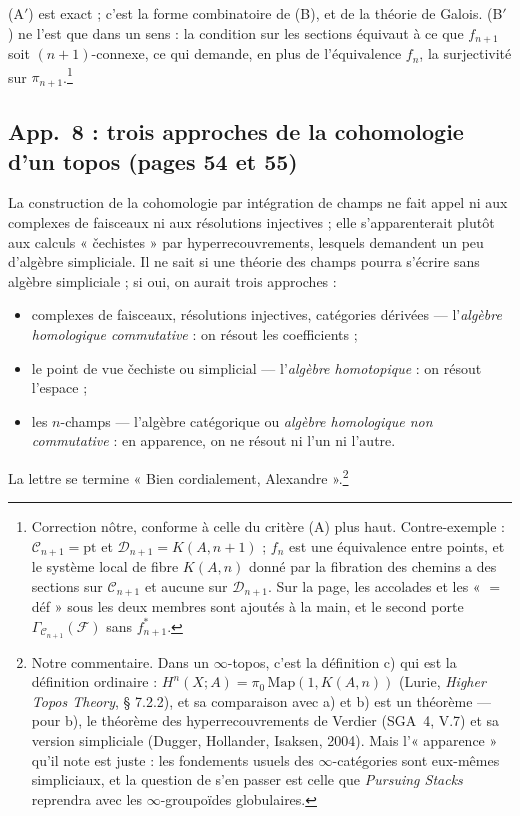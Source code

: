 \documentclass[11pt,a4paper]{article}
\begin{document}
(A$'$) est exact ; c'est la forme combinatoire de (B), et de la
théorie de Galois. (B$'$) ne l'est que dans un sens : la condition sur les
sections équivaut à ce que $f_{n+1}$ soit $(n+1)$-connexe, ce qui demande, en
plus de l'équivalence $f_n$, la surjectivité sur
$\pi_{n+1}$.\footnote{Correction nôtre, conforme à celle du critère (A) plus
haut. Contre-exemple : $\mathcal{C}_{n+1} = \mathrm{pt}$ et
$\mathcal{D}_{n+1} = K(A,n+1)$ ; $f_n$ est une équivalence entre points, et le
système local de fibre $K(A,n)$ donné par la fibration des chemins a des
sections sur $\mathcal{C}_{n+1}$ et aucune sur $\mathcal{D}_{n+1}$. Sur la
page, les accolades et les « $=$ déf » sous les deux membres sont ajoutés à
la main, et le second porte $\Gamma_{\mathcal{C}_{n+1}}(\mathcal{F})$ sans
$f_{n+1}^*$.}

\subsection*{App.~8 : trois approches de la cohomologie d'un topos (pages 54 et 55)}

La construction de la cohomologie par intégration de champs ne fait appel
ni aux complexes de faisceaux ni aux résolutions injectives ; elle
s'apparenterait plutôt aux calculs « čechistes » par hyperrecouvrements,
lesquels demandent un peu d'algèbre simpliciale. Il ne sait si une théorie
des champs pourra s'écrire sans algèbre simpliciale ; si oui, on aurait
trois approches :

\begin{itemize}
  \item[a)] complexes de faisceaux, résolutions injectives, catégories
  dérivées --- l'\emph{algèbre homologique commutative} : on résout les
  coefficients ;
  \item[b)] le point de vue čechiste ou simplicial --- l'\emph{algèbre
  homotopique} : on résout l'espace ;
  \item[c)] les $n$-champs --- l'algèbre catégorique ou \emph{algèbre
  homologique non commutative} : en apparence, on ne résout ni l'un ni
  l'autre.
\end{itemize}

La lettre se termine « Bien cordialement, Alexandre ».\footnote{Notre
commentaire. Dans un $\infty$-topos, c'est la définition c) qui est la
définition ordinaire : $H^n(X;A) = \pi_0\,\mathrm{Map}(1,K(A,n))$ (Lurie,
\emph{Higher Topos Theory}, § 7.2.2), et sa comparaison avec a) et b) est un
théorème --- pour b), le théorème des hyperrecouvrements de Verdier
(SGA~4, V.7) et sa version simpliciale (Dugger, Hollander, Isaksen, 2004). Mais
l'« apparence » qu'il note est juste : les fondements usuels des
$\infty$-catégories sont eux-mêmes simpliciaux, et la question de s'en
passer est celle que \emph{Pursuing Stacks} reprendra avec les
$\infty$-groupoïdes globulaires.}
\end{document}
